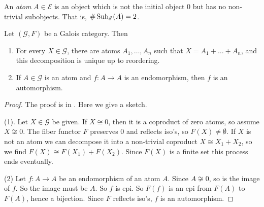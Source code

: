 An \emph{atom}  $A \in \mathscr{E}$ is an object which is not the initial object $0$ but has no non-trivial subobjects. That is, $\# \operatorname{Sub}_{\mathscr{E}}(A) = 2$.

\begin{lemma}
\label{lem:decomp of atoms and every endo is an auto of an atom}
Let $(\mathscr{G},F)$ be a Galois category. Then
\begin{enumerate}
	\item For every $X \in \mathscr{G}$, there are atoms $A_1,\ldots,A_n$ such that $X = A_1 + \ldots + A_n$, and this decomposition is unique up to reordering.
	\item If $A \in \mathscr{G}$ is an atom and $f : A \to A$ is an endomorphism, then $f$ is an automorphism.
\end{enumerate}
\end{lemma}
\begin{proof}
The proof is in \cite[Lemma 8.44]{johnstone77}. Here we give a sketch.

(1). Let $X \in \mathscr{G}$ be given. If $X \cong 0$, then it is a coproduct of zero atoms, so assume $X \not \cong 0$. The fiber functor $F$ preserves $0$ and reflects iso's, so $F(X) \neq \emptyset$. If $X$ is not an atom we can decompose it into a non-trivial coproduct $X \cong X_1 + X_2$, so we find $F(X) \cong F(X_1) + F(X_2)$. Since $F(X)$ is a finite set this process ends eventually.

(2) Let $f : A\to A$ be an endomorphism of an atom $A$. Since $A \not \cong 0$, so is the image of $f$. So the image must be $A$. So $f$ is epi. So $F(f)$ is an epi from $F(A)$ to $F(A)$, hence a bijection. Since $F$ reflects iso's, $f$ is an automorphism.
\end{proof}

